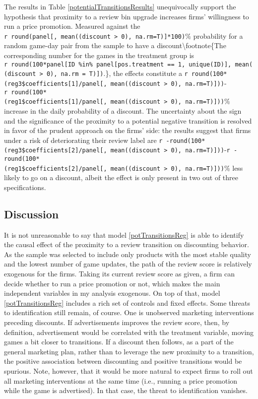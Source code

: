 \documentclass[
  12pt,
  pagebackref]{article}
\begin{document}
The results in Table \ref{potentialTransitionsResults} unequivocally
support the hypothesis that proximity to a review bin upgrade increases
firms' willingness to run a price promotion. Measured against the
\texttt{r\ round(panel{[},\ mean((discount\ \textgreater{}\ 0),\ na.rm=T){]}*100)}\%
probability for a random game-day pair from the sample to have a
discount\textbackslash footnote\{The corresponding number for the games
in the treatment group is
\texttt{r\ round(100*panel{[}ID\ \%in\%\ panel{[}pos.treatment\ ==\ 1,\ unique(ID){]},\ mean((discount\ \textgreater{}\ 0),\ na.rm\ =\ T){]})}.\},
the effects constitute a
\texttt{r\ round(100*(reg3\$coefficients{[}1{]}/panel{[},\ mean((discount\ \textgreater{}\ 0),\ na.rm=T){]}))}-\texttt{r\ round(100*(reg1\$coefficients{[}1{]}/panel{[},\ mean((discount\ \textgreater{}\ 0),\ na.rm=T){]}))}\%
increase in the daily probability of a discount. The uncertainty about
the sign and the significance of the proximity to a potential negative
transition is resolved in favor of the prudent approach on the firms'
side: the results suggest that firms under a risk of deteriorating their
review label are
\texttt{r\ -round(100*(reg3\$coefficients{[}2{]}/panel{[},\ mean((discount\ \textgreater{}\ 0),\ na.rm=T){]}))}-\texttt{r\ -round(100*(reg1\$coefficients{[}2{]}/panel{[},\ mean((discount\ \textgreater{}\ 0),\ na.rm=T){]}))}\%
less likely to go on a discount, albeit the effect is only present in
two out of three specifications.

\hypertarget{discussion}{%
\subsection{Discussion}\label{discussion}}

It is not unreasonable to say that model \ref{potTransitionsReg} is able
to identify the causal effect of the proximity to a review transition on
discounting behavior. As the sample was selected to include only
products with the most stable quality and the lowest number of game
updates, the path of the review score is relatively exogenous for the
firms. Taking its current review score as given, a firm can decide
whether to run a price promotion or not, which makes the main
independent variables in my analysis exogenous. On top of that, model
\ref{potTransitionsReg} includes a rich set of controls and fixed
effects. Some threats to identification still remain, of course. One is
unobserved marketing interventions preceding discounts. If
advertisements improves the review score, then, by definition,
advertisement would be correlated with the treatment variable, moving
games a bit closer to transitions. If a discount then follows, as a part
of the general marketing plan, rather than to leverage the new proximity
to a transition, the positive association between discounting and
positive transitions would be spurious. Note, however, that it would be
more natural to expect firms to roll out all marketing interventions at
the same time (i.e., running a price promotion while the game is
advertised). In that case, the threat to identification vanishes.
\end{document}
